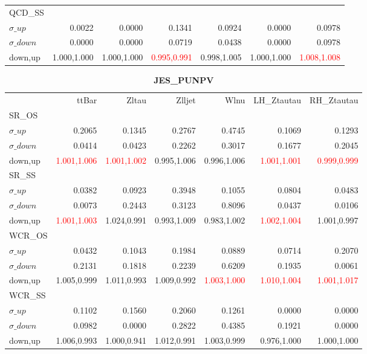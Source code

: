 \documentclass[11pt,oneside,a4paper]{article}
\begin{document}
\begin{table}
\begin{tabular}{lrrrrrr}
\hline
QCD\_SS &  &  &  &  &  &  \\
$\sigma\_up$ & 0.0022 & 0.0000 & 0.1341 & 0.0924 & 0.0000 & 0.0978 \\
$\sigma\_down$ & 0.0000 & 0.0000 & 0.0719 & 0.0438 & 0.0000 & 0.0978 \\
down,up & 1.000,1.000 & 1.000,1.000 & \textcolor{red}{0.995,0.991} & 0.998,1.005 & 1.000,1.000 & \textcolor{red}{1.008,1.008} \\

\hline
\end{tabular}
\end{table}
\begin{table}
\centering
\caption{\bf{JES\_PUNPV}}
\begin{tabular}{lrrrrrr}
 & ttBar & Zltau & Zlljet & Wlnu & LH\_Ztautau & RH\_Ztautau \\
SR\_OS &  &  &  &  &  &  \\
$\sigma\_up$ & 0.2065 & 0.1345 & 0.2767 & 0.4745 & 0.1069 & 0.1293 \\
$\sigma\_down$ & 0.0414 & 0.0423 & 0.2262 & 0.3017 & 0.1677 & 0.2045 \\
down,up & \textcolor{red}{1.001,1.006} & \textcolor{red}{1.001,1.002} & 0.995,1.006 & 0.996,1.006 & \textcolor{red}{1.001,1.001} & \textcolor{red}{0.999,0.999} \\

\hline
SR\_SS &  &  &  &  &  &  \\
$\sigma\_up$ & 0.0382 & 0.0923 & 0.3948 & 0.1055 & 0.0804 & 0.0483 \\
$\sigma\_down$ & 0.0073 & 0.2443 & 0.3123 & 0.8096 & 0.0437 & 0.0106 \\
down,up & \textcolor{red}{1.001,1.003} & 1.024,0.991 & 0.993,1.009 & 0.983,1.002 & \textcolor{red}{1.002,1.004} & 1.001,0.997 \\

\hline
WCR\_OS &  &  &  &  &  &  \\
$\sigma\_up$ & 0.0432 & 0.1043 & 0.1984 & 0.0889 & 0.0714 & 0.2070 \\
$\sigma\_down$ & 0.2131 & 0.1818 & 0.2239 & 0.6209 & 0.1935 & 0.0061 \\
down,up & 1.005,0.999 & 1.011,0.993 & 1.009,0.992 & \textcolor{red}{1.003,1.000} & \textcolor{red}{1.010,1.004} & \textcolor{red}{1.001,1.017} \\

\hline
WCR\_SS &  &  &  &  &  &  \\
$\sigma\_up$ & 0.1102 & 0.1560 & 0.2060 & 0.1261 & 0.0000 & 0.0000 \\
$\sigma\_down$ & 0.0982 & 0.0000 & 0.2822 & 0.4385 & 0.1921 & 0.0000 \\
down,up & 1.006,0.993 & 1.000,0.941 & 1.012,0.991 & 1.003,0.999 & 0.976,1.000 & 1.000,1.000 \\


\end{tabular}
\end{table}
\end{document}
